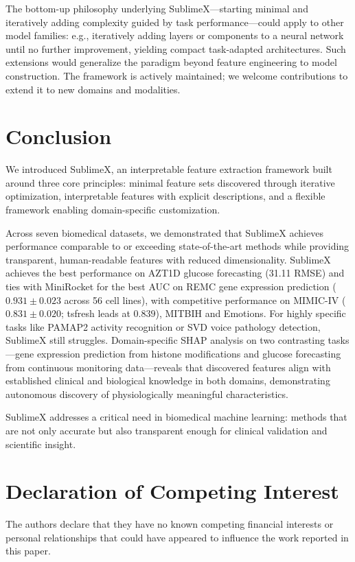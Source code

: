 \documentclass[times, review, 10pt]{elsarticle}
\begin{document}
The bottom-up philosophy underlying SublimeX---starting minimal and iteratively adding complexity guided by task
performance---could apply to other model families: e.g., iteratively adding layers or components to a neural network until no further improvement, yielding
compact task-adapted architectures. Such extensions would generalize the paradigm beyond feature engineering to model construction.
The framework is actively maintained; we welcome contributions to extend it to new domains and modalities. 

\section{Conclusion}
We introduced SublimeX, an interpretable feature extraction framework built around three core principles: minimal feature sets discovered
through iterative optimization, interpretable features with explicit descriptions, and a flexible framework enabling domain-specific customization.

Across seven biomedical datasets, we demonstrated that SublimeX achieves performance comparable to or exceeding
state-of-the-art methods while providing transparent, human-readable
features with reduced dimensionality. SublimeX achieves the best
performance on AZT1D glucose forecasting (31.11 RMSE) and ties with MiniRocket
for the best AUC on REMC gene expression prediction ($0.931 \pm 0.023$ across
56 cell lines), with competitive performance on MIMIC-IV ($0.831 \pm 0.020$; tsfresh leads at $0.839$), MITBIH and Emotions. 
For highly specific tasks like PAMAP2 activity recognition or SVD voice pathology detection, SublimeX still struggles. 
Domain-specific SHAP analysis on two contrasting tasks---gene
expression prediction from histone modifications and glucose
forecasting from continuous monitoring data---reveals that
discovered features align with established clinical and
biological knowledge in both domains, demonstrating autonomous
discovery of physiologically meaningful characteristics.

SublimeX addresses a critical need in biomedical machine learning: methods that
are not only accurate but also transparent enough for clinical validation and scientific insight. 

\section*{Declaration of Competing Interest}

The authors declare that they have no known competing financial interests or personal relationships that could have appeared to influence the work reported in this paper.
\end{document}
